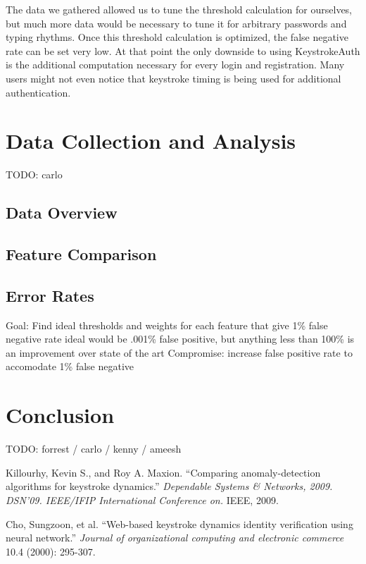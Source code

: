 \documentclass{article}
\begin{document}
The data we gathered allowed us to tune the threshold calculation for ourselves, but much more data would be necessary to tune it for arbitrary passwords and typing rhythms. Once this threshold calculation is optimized, the false negative rate can be set very low. 
At that point the only downside to using KeystrokeAuth is the additional computation necessary for every login and registration.
Many users might not even notice that keystroke timing is being used for additional authentication.



\section{Data Collection and Analysis}
TODO: carlo

\subsection{Data Overview}

\subsection{Feature Comparison} %


\subsection{Error Rates}    %

Goal: Find ideal thresholds and weights for each feature that give 1\% false negative rate
ideal would be  .001\% false positive, but anything less than 100\% is an improvement over state of the art
Compromise: increase false positive rate to accomodate 1\% false negative

\section{Conclusion}
TODO: forrest / carlo / kenny / ameesh


\begin{thebibliography}{99}
   Killourhy, Kevin S., and Roy A. Maxion. 
   ``Comparing anomaly-detection algorithms for keystroke dynamics.''
   \textit{Dependable Systems \& Networks, 2009. DSN'09. IEEE/IFIP International Conference on.}
   IEEE, 2009. 
 
   Cho, Sungzoon, et al.
   ``Web-based keystroke dynamics identity verification using neural network.'' 
   \textit{Journal of organizational computing and electronic commerce}
   10.4 (2000): 295-307.
  
\end{thebibliography}
\end{document}
